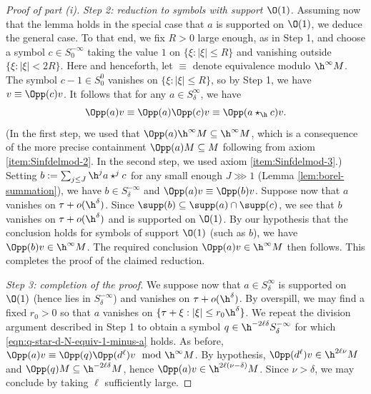 \begin{proof}[Proof of part (i)]
  \emph{Step 2: reduction to symbols with support $\O(1)$.}  Assuming now that the lemma holds in the special case that $a$ is supported on $\O(1)$, we deduce the general case.  To that end, we fix $R > 0$ large enough, as in Step 1, and choose a symbol $c \in S^{-\infty}_0$ taking the value $1$ on $\{\xi : |\xi| \leq R\}$ and vanishing outside $\{\xi : |\xi| < 2 R\}$.  Here and henceforth, let $\equiv$ denote equivalence modulo $\h^\infty M$.  The symbol $c-1 \in S^0_0$ vanishes on $\{ \xi : |\xi| \leq R \}$, so by Step 1, we have $v \equiv \Opp(c) v$.  It follows that for any $a \in S_\delta^\infty$, we have
  \[
    \Opp(a) v \equiv \Opp(a) \Opp(c) v \equiv \Opp(a \star_{\h} c) v.
  \]
  (In the first step, we used that $\Opp(a) \h^\infty M \subseteq \h^\infty M$, which is a consequence of the more precise containment $\Opp(a) M \subseteq M$ following from axiom  \eqref{item:Sinfdelmod-2}.  In the second step, we used axiom \eqref{item:Sinfdelmod-3}.)
  Setting $b := \sum_{j \leq J} \h^j a \star^j c$ for any small enough $J \ggg 1$ (Lemma \ref{lem:borel-summation}), we have $b \in S^{-\infty}_\delta$ and $\Opp(a) v \equiv \Opp(b) v$.  Suppose now that $a$ vanishes on $\tau + o(\h^\delta)$.  Since $\supp(b) \subseteq \supp(a) \cap \supp(c)$, we see that $b$ vanishes on $\tau + o(\h^\delta)$ and is supported on $\O(1)$.  By our hypothesis that the conclusion holds for symbols of support $\O(1)$ (such as $b$), we have $\Opp(b) v \in \h^\infty M$.  The required conclusion $\Opp(a) v \in \h^\infty M$ then follows.  This completes the proof of the claimed reduction.

  \emph{Step 3: completion of the proof.}  We suppose now that $a \in S^{\infty}_\delta$ is supported on $\O(1)$ (hence lies in $S^{-\infty}_\delta$) and vanishes on $\tau + o(\h^\delta)$.  By overspill, we may find a fixed $r_0 > 0$ so that $a$ vanishes on $\{\tau + \xi : |\xi| \leq r_0 \h^{\delta}\}$.  We repeat the division argument described in Step 1 to obtain a symbol $q \in \h^{-2 \ell \delta} S^{-\infty}_\delta$ for which \eqref{eqn:q-star-d-N-equiv-1-minus-a} holds. %
  As before, $\Opp(a) v \equiv \Opp(q) \Opp(d^\ell ) v \mod {\h^\infty M}$.  By hypothesis, $\Opp(d^\ell) v \in \h^{2 \ell \nu} M$ and $\Opp(q) M \subseteq \h^{-2 \ell \delta} M$, hence $\Opp(a) v \in \h^{2 \ell (\nu - \delta)} M$.  Since $\nu > \delta$, we may conclude by taking $\ell$ sufficiently large.
\end{proof}
